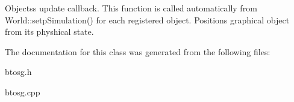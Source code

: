 Objects\textquotesingle{}s update callback. This function is called automatically from World\+::setp\+Simulation() for each registered object. Positions graphical object from its physhical state. 

The documentation for this class was generated from the following files\+:\begin{DoxyCompactItemize}
\item 
btosg.\+h\item 
btosg.\+cpp\end{DoxyCompactItemize}
